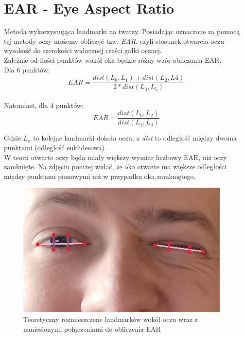 \documentclass[10pt, a4paper]{article}
\begin{document}
\section{EAR - Eye Aspect Ratio}
Metoda wykorzystująca landmarki na twarzy. Posiadając oznaczone za pomocą tej metody oczy możemy obliczyć tzw. \textit{EAR}, czyli stosunek otwarcia oczu - wysokość do szerokości widocznej części gałki ocznej. \cite{EARRaspberryPi} \cite{eyeBlinkEARRosebrock}\\

Zależnie od ilości punktów wokół oka będzie różny wzór obliczania EAR.\\
Dla 6 punktów:
\begin{equation}
    EAR = \frac{dist(L_0, L_1) + dist(L_2, L4)}{2 * dist(L_3, L_5)}
\end{equation}
\\
Natomiast, dla 4 punktów:
\begin{equation}
    EAR = \frac{dist(L_0, L_2)}{dist(L_1, L_3)}
\end{equation}

Gdzie \textit{$L_x$} to kolejne landmarki dokoła oczu, a \textit{dist} to odległość między dwoma punktami (odległość euklidesowa).\\

W teorii otwarte oczy będą miały większy wymiar liczbowy EAR, niż oczy zamknięte. Na zdjęciu poniżej widać, że oko otwarte ma większe odległości między punktami pionowymi niż w przypadku  oka zamkniętego. 

\begin{figure}[H]
    \begin{center}
        \includegraphics[scale=0.35]{images/theoretical_eye_landmarks.jpg}
        \caption{Teoretyczny rozmieszczene landmarków wokół oczu wraz z naniesionymi połączeniami do obliczenia EAR}
        \label{fig:theoretical_eye_landmarks}
    \end{center}
\end{figure}
\end{document}
